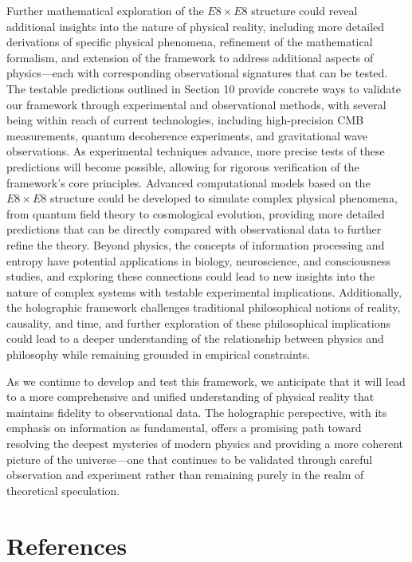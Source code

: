 \documentclass[11pt,english,twoside]{article}
\begin{document}
Further mathematical exploration of the $E8\times E8$ structure could reveal additional insights into the nature of physical reality, including more detailed derivations of specific physical phenomena, refinement of the mathematical formalism, and extension of the framework to address additional aspects of physics—each with corresponding observational signatures that can be tested. The testable predictions outlined in Section 10 provide concrete ways to validate our framework through experimental and observational methods, with several being within reach of current technologies, including high-precision CMB measurements, quantum decoherence experiments, and gravitational wave observations. As experimental techniques advance, more precise tests of these predictions will become possible, allowing for rigorous verification of the framework's core principles. Advanced computational models based on the $E8\times E8$ structure could be developed to simulate complex physical phenomena, from quantum field theory to cosmological evolution, providing more detailed predictions that can be directly compared with observational data to further refine the theory. Beyond physics, the concepts of information processing and entropy have potential applications in biology, neuroscience, and consciousness studies, and exploring these connections could lead to new insights into the nature of complex systems with testable experimental implications. Additionally, the holographic framework challenges traditional philosophical notions of reality, causality, and time, and further exploration of these philosophical implications could lead to a deeper understanding of the relationship between physics and philosophy while remaining grounded in empirical constraints.

As we continue to develop and test this framework, we anticipate that it will lead to a more comprehensive and unified understanding of physical reality that maintains fidelity to observational data. The holographic perspective, with its emphasis on information as fundamental, offers a promising path toward resolving the deepest mysteries of modern physics and providing a more coherent picture of the universe—one that continues to be validated through careful observation and experiment rather than remaining purely in the realm of theoretical speculation.

\section{References}
\end{document}

